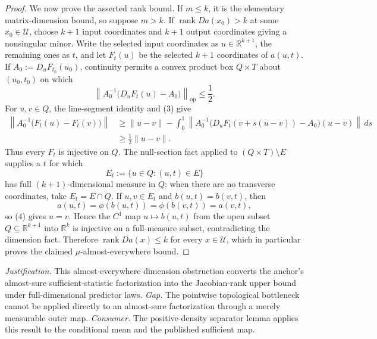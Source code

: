 \documentclass{article}
\begin{document}
\begin{proof}
We now prove the asserted rank bound.  If \(m\leq k\), it is the elementary matrix-dimension bound, so suppose \(m>k\).  If \(\operatorname{rank}Da(x_0)>k\) at some \(x_0\in\mathcal U\), choose \(k+1\) input coordinates and \(k+1\) output coordinates giving a nonsingular minor.  Write the selected input coordinates as \(u\in\mathbb R^{k+1}\), the remaining ones as \(t\), and let \(F_t(u)\) be the selected \(k+1\) coordinates of \(a(u,t)\).  If \(A_0:=D_uF_{t_0}(u_0)\), continuity permits a convex product box \(Q\times T\) about \((u_0,t_0)\) on which
\[
 \left\|A_0^{-1}\bigl(D_uF_t(u)-A_0\bigr)\right\|_{\mathrm{op}}\leq\frac12. \tag{3}
\]
For \(u,v\in Q\), the line-segment identity and (3) give
\[
 \begin{aligned}
 \left\|A_0^{-1}\bigl(F_t(u)-F_t(v)\bigr)\right\|
 &\geq \|u-v\|
 -\int_0^1\left\|A_0^{-1}
 \bigl(D_uF_t(v+s(u-v))-A_0\bigr)(u-v)\right\|\,ds\\
 &\geq\frac12\|u-v\|. 
 \end{aligned} \tag{4}
\]
Thus every \(F_t\) is injective on \(Q\).  The null-section fact applied to \((Q\times T)\setminus E\) supplies a \(t\) for which
\[
 E_t:=\{u\in Q:(u,t)\in E\}
\]
has full \((k+1)\)-dimensional measure in \(Q\); when there are no transverse coordinates, take \(E_t=E\cap Q\).  If \(u,v\in E_t\) and \(b(u,t)=b(v,t)\), then
\[
 a(u,t)=\phi(b(u,t))=\phi(b(v,t))=a(v,t),
\]
so (4) gives \(u=v\).  Hence the \(C^1\) map \(u\mapsto b(u,t)\) from the open subset \(Q\subseteq\mathbb R^{k+1}\) into \(\mathbb R^k\) is injective on a full-measure subset, contradicting the dimension fact.  Therefore \(\operatorname{rank}Da(x)\leq k\) for every \(x\in\mathcal U\), which in particular proves the claimed \(\mu\)-almost-everywhere bound.
\end{proof}
\par\smallskip\noindent \textit{Justification.} This almost-everywhere dimension obstruction converts the anchor's almost-sure sufficient-statistic factorization into the Jacobian-rank upper bound under full-dimensional predictor laws. \textit{Gap.} The pointwise topological bottleneck cannot be applied directly to an almost-sure factorization through a merely measurable outer map. \textit{Consumer.} The positive-density separator lemma applies this result to the conditional mean and the published sufficient map.
\end{document}
